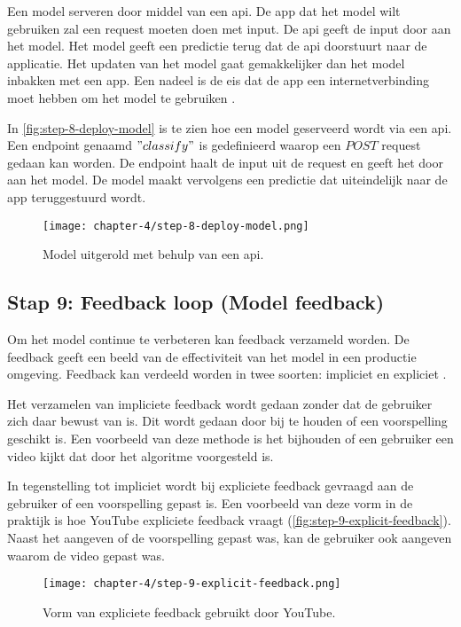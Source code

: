 Een model serveren door middel van een \Acrshort{api}. De app dat het model wilt gebruiken zal een request moeten doen met input. De \Acrshort{api} geeft de input door aan het model. Het model geeft een predictie terug dat de \Acrshort{api} doorstuurt naar de applicatie. Het updaten van het model gaat gemakkelijker dan het model inbakken met een app. Een nadeel is de eis dat de app een internetverbinding moet hebben om het model te gebruiken \cite[p.~130]{introduction-to-machine-learning}.

In \autoref{fig:step-8-deploy-model} is te zien hoe een model geserveerd wordt via een \Acrshort{api}. Een endpoint genaamd \("classify"\) is gedefinieerd waarop een \(POST\) request gedaan kan worden. De endpoint haalt de input uit de request en geeft het door aan het model. De model maakt vervolgens een predictie dat uiteindelijk naar de app teruggestuurd wordt.

\begin{figure}[hbt!]
  \centering
  \texttt{[image: chapter-4/step-8-deploy-model.png]}
  \caption{Model uitgerold met behulp van een \Acrshort{api}.}
  \label{fig:step-8-deploy-model}
\end{figure}

\subsection{Stap 9: Feedback loop (Model feedback)}\label{subsec:ch4-feebdack-loop}
Om het model continue te verbeteren kan feedback verzameld worden. De feedback geeft een beeld van de effectiviteit van het model in een productie omgeving. Feedback kan verdeeld worden in twee soorten: impliciet en expliciet \cite[p.~264]{introduction-to-machine-learning}.

Het verzamelen van impliciete feedback wordt gedaan zonder dat de gebruiker zich daar bewust van is. Dit wordt gedaan door bij te houden of een voorspelling geschikt is. Een voorbeeld van deze methode is het bijhouden of een gebruiker een video kijkt dat door het algoritme voorgesteld is.

In tegenstelling tot impliciet wordt bij expliciete feedback gevraagd aan de gebruiker of een voorspelling gepast is. Een voorbeeld van deze vorm in de praktijk is hoe YouTube expliciete feedback vraagt (\autoref{fig:step-9-explicit-feedback}). Naast het aangeven of de voorspelling gepast was, kan de gebruiker ook aangeven waarom de video gepast was.

\begin{figure}[hbt!]
  \centering
  \texttt{[image: chapter-4/step-9-explicit-feedback.png]}
  \caption{Vorm van expliciete feedback gebruikt door YouTube.}
  \label{fig:step-9-explicit-feedback}
\end{figure}


